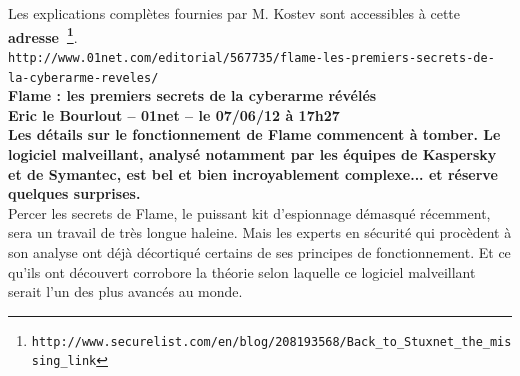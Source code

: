 \documentclass[11pt,twoside,a4paper]{article}
\begin{document}
Les explications compl{\`e}tes fournies par M. Kostev sont accessibles {\`a} cette \textbf{adresse~\footnote{\texttt{http://www.securelist.com/en/blog/208193568/Back\_to\_Stuxnet\_the\_missing\_link}}}. ~\\


\texttt{http://www.01net.com/editorial/567735/flame-les-premiers-secrets-de-la-cyberarme-reveles/}~\\

\textbf{\LARGE Flame : les premiers secrets de la cyberarme r{\'e}v{\'e}l{\'e}s}~\\

\textbf{\small Eric le Bourlout -- 01net -- le 07/06/12 {\`a} 17h27}~\\

\textbf{Les d{\'e}tails sur le fonctionnement de Flame commencent {\`a} tomber. Le logiciel malveillant, analys{\'e} notamment par les {\'e}quipes de Kaspersky et de Symantec, est bel et bien incroyablement complexe... et r{\'e}serve quelques surprises.}~\\ 

Percer les secrets de Flame, le puissant kit d'espionnage d{\'e}masqu{\'e} r{\'e}cemment, sera un travail de tr{\`e}s longue haleine. Mais les experts en s{\'e}curit{\'e} qui proc{\`e}dent {\`a} son analyse ont d{\'e}j{\`a} d{\'e}cortiqu{\'e} certains de ses principes de fonctionnement. Et ce qu'ils ont d{\'e}couvert corrobore la th{\'e}orie selon laquelle ce logiciel malveillant serait l'un des plus avanc{\'e}s au monde.~\\
\end{document}

